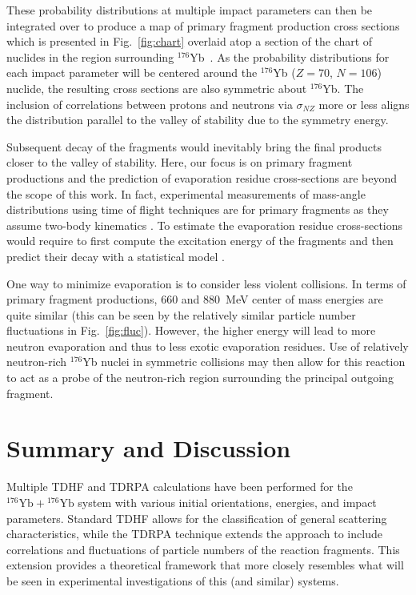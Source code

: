 \documentclass[reprint,aps,prc,twocolumn,superscriptaddress,floatfix,10pt]{revtex4-2}
\begin{document}
These probability distributions at multiple impact parameters can then be integrated over to produce a map of primary fragment production cross sections which is presented in Fig.~\ref{fig:chart} overlaid atop a section of the chart of nuclides in the region surrounding $^{176}$Yb~\cite{anu_chart}.
As the probability distributions for each impact parameter will be centered around the $^{176}$Yb ($Z=70$, $N=106$) nuclide, the resulting cross sections are also symmetric about $^{176}$Yb.
The inclusion of correlations between protons and neutrons via $\sigma_{NZ}$ more or less aligns the distribution parallel to the valley of stability  due to the symmetry energy.

Subsequent decay of the fragments would inevitably bring the final products closer to the valley of stability.
Here, our focus is on primary fragment productions and the prediction of evaporation residue cross-sections are beyond the scope of this work.
In fact, experimental measurements of mass-angle distributions using time of flight techniques are for primary fragments as they assume two-body kinematics \cite{thomas2008}. 
To estimate the evaporation residue cross-sections would require to first compute the excitation energy of the fragments and then predict their decay with a statistical model \cite{umar2017,sekizawa2017}. 

One way to minimize evaporation is to consider less violent collisions. 
In terms of primary fragment productions, 660 and 880~MeV center of mass energies are quite similar (this can be seen by the relatively similar particle number fluctuations in Fig.~\ref{fig:fluc}). 
However, the higher energy will lead to more neutron evaporation and thus to less exotic evaporation residues. 
Use of relatively neutron-rich $^{176}$Yb nuclei in symmetric collisions may then allow for this reaction to act as a probe of the neutron-rich region surrounding the principal outgoing fragment.


\section{Summary and Discussion}\label{sec:conclusions}

Multiple TDHF and TDRPA calculations have been performed for the $^{176}\mathrm{Yb}+{}^{176}\mathrm{Yb}$ system with various initial orientations, energies, and impact parameters.
Standard TDHF allows for the classification of general scattering characteristics, while the TDRPA technique extends the approach to include correlations and fluctuations of particle numbers of the reaction fragments.
This extension provides a theoretical framework that more closely resembles what will be seen in experimental investigations of this (and similar) systems.
\end{document}
